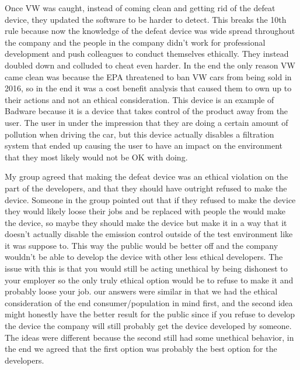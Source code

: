 \documentclass[11pt]{article}
\begin{document}
  Once VW was caught, instead of coming clean and getting rid of the defeat device, they updated the software to be harder to detect. This breaks the 10th rule because
  now the knowledge of the defeat device was wide spread throughout the company and the people in the company didn't work for professional development and push
  colleagues to conduct themselves ethically. They instead doubled down and colluded to cheat even harder. In the end the only reason VW came clean was because the
  EPA threatened to ban VW cars from being sold in 2016, so in the end it was a cost benefit analysis that caused them to own up to their actions and not an ethical
  consideration. This device is an example of Badware because it is a device that takes control of the product away from the user. The user in under the impression
  that they are doing a certain amount of pollution when driving the car, but this device actually disables a filtration system that ended up causing the user
  to have an impact on the environment that they most likely would not be OK with doing.

  My group agreed that making the defeat device was an ethical violation on the part of the developers, and that they should have outright refused to make the device.
  Someone in the group pointed out that if they refused to make the device they would likely loose their jobs and be replaced with people the would make the device,
  so maybe they should make the device but make it in a way that it doesn't actually disable the emission control outside of the test environment like it was suppose to.
  This way the public would be better off and the company wouldn't be able to develop the device with other less ethical developers. The issue with this is that you would
  still be acting unethical by being dishonest to your employer so the only truly ethical option would be to refuse to make it and probably loose your job. our answers
  were similar in that we had the ethical consideration of the end consumer/population in mind first, and the second idea might honestly have the better result
  for the public since if you refuse to develop the device the company will still probably get the device developed by someone. The ideas were different because
  the second still had some unethical behavior, in the end we agreed that the first option was probably the best option for the developers.
\end{document}
